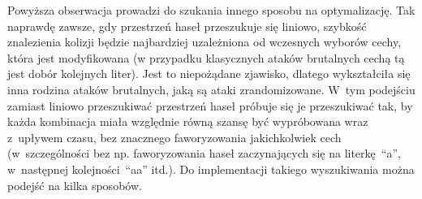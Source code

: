 Powyższa obserwacja prowadzi do szukania innego sposobu na optymalizację. Tak
naprawdę zawsze, gdy przestrzeń haseł przeszukuje się liniowo, szybkość
znalezienia kolizji będzie najbardziej uzależniona od wczesnych wyborów cechy,
która jest modyfikowana (w przypadku klasycznych ataków brutalnych cechą tą
jest dobór kolejnych liter). Jest to niepożądane zjawisko, dlatego wykształciła
się inna rodzina ataków brutalnych, jaką są ataki zrandomizowane. W~tym
podejściu zamiast liniowo przeszukiwać przestrzeń haseł próbuje się je
przeszukiwać tak, by każda kombinacja miała względnie równą szansę być
wypróbowana wraz z~upływem czasu, bez znacznego faworyzowania jakichkolwiek
cech (w~szczególności bez np. faworyzowania haseł zaczynających się na
literkę~``a'', w~następnej kolejności~``aa'' itd.). Do implementacji takiego
wyszukiwania można podejść na kilka sposobów.
